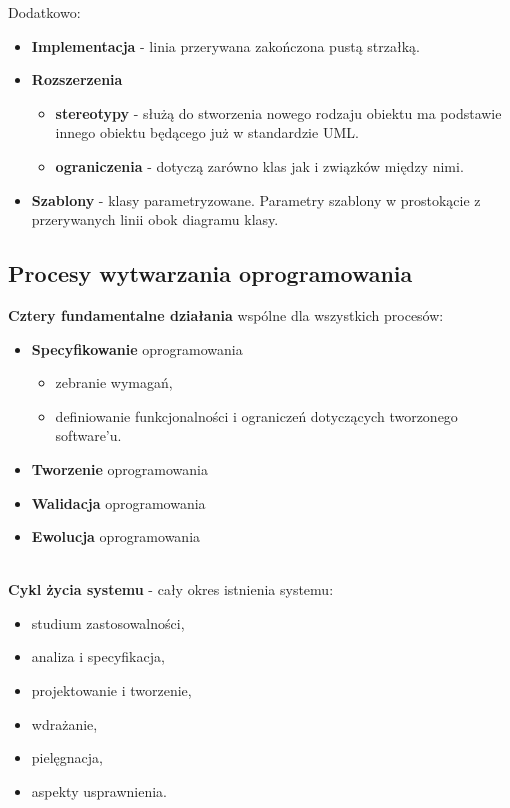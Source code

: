 \documentclass[a4paper]{article}
\begin{document}
    Dodatkowo:
    \begin{itemize}
        \item \textbf{Implementacja} - linia przerywana
        zakończona pustą strzałką.
        \item \textbf{Rozszerzenia}
        \begin{itemize}
            \item \textbf{stereotypy} - służą do stworzenia nowego rodzaju obiektu ma podstawie innego obiektu
            będącego już w standardzie UML.
            \item \textbf{ograniczenia} - dotyczą zarówno klas jak i związków między nimi.
        \end{itemize}
        \item \textbf{Szablony} - klasy parametryzowane. Parametry szablony w prostokącie z przerywanych linii
        obok diagramu klasy.
    \end{itemize}


    \subsection{Procesy wytwarzania oprogramowania}

    \textbf{Cztery fundamentalne działania }wspólne dla wszystkich procesów:
    \begin{itemize}
        \item \textbf{Specyfikowanie} oprogramowania
        \begin{itemize}
            \item zebranie wymagań,
            \item definiowanie funkcjonalności i ograniczeń dotyczących
            tworzonego software’u.
        \end{itemize}
        \item \textbf{Tworzenie} oprogramowania
        \item \textbf{Walidacja} oprogramowania
        \item \textbf{Ewolucja} oprogramowania
    \end{itemize}

    \hfill \\
    \textbf{Cykl życia systemu} - cały okres istnienia systemu:
    \begin{itemize}
        \item studium zastosowalności,
        \item analiza i specyfikacja,
        \item projektowanie i tworzenie,
        \item wdrażanie,
        \item pielęgnacja,
        \item aspekty usprawnienia.
    \end{itemize}
\end{document}

